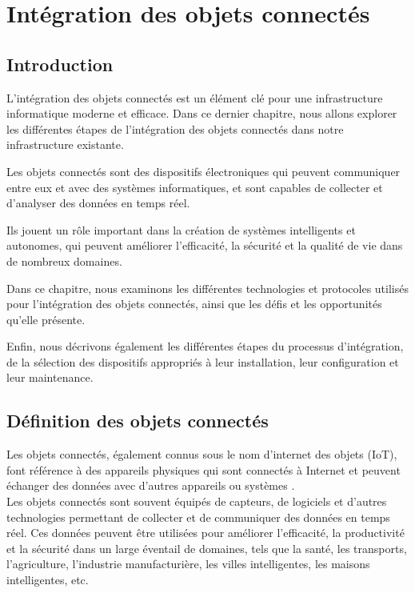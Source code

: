 \chapter{Intégration des objets connectés}

\section{Introduction}

L'intégration des objets connectés est un élément clé pour une infrastructure informatique moderne et efficace. Dans ce dernier chapitre, nous allons explorer les différentes étapes de l'intégration des objets connectés dans notre infrastructure existante. 

Les objets connectés sont des dispositifs électroniques qui peuvent communiquer entre eux et avec des systèmes informatiques, et sont capables de collecter et d'analyser des données en temps réel. 

Ils jouent un rôle important dans la création de systèmes intelligents et autonomes, qui peuvent améliorer l'efficacité, la sécurité et la qualité de vie dans de nombreux domaines. 

Dans ce chapitre, nous examinons les différentes technologies et protocoles utilisés pour l'intégration des objets connectés, ainsi que les défis et les opportunités qu'elle présente. 

Enfin, nous décrivons également les différentes étapes du processus d'intégration, de la sélection des dispositifs appropriés à leur installation, leur configuration et leur maintenance. 



\section{Définition des objets connectés}

Les objets connectés, également connus sous le nom d'internet des objets (IoT), font référence à des appareils physiques qui sont connectés à Internet et peuvent échanger des données avec d'autres appareils ou systèmes \cite{gazis2021iot}. \\

Les objets connectés sont souvent équipés de capteurs, de logiciels et d'autres technologies permettant de collecter et de communiquer des données en temps réel. Ces données peuvent être utilisées pour améliorer l'efficacité, la productivité et la sécurité dans un large éventail de domaines, tels que la santé, les transports, l'agriculture, l'industrie manufacturière, les villes intelligentes, les maisons intelligentes, etc. \\

